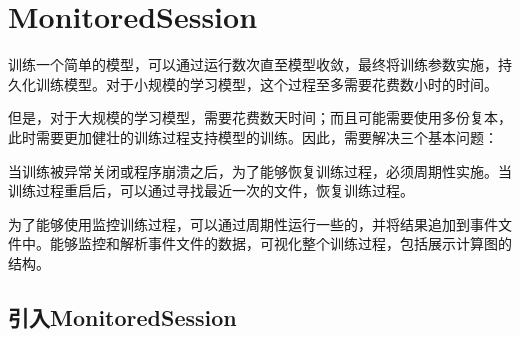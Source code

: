 \begin{savequote}[45mm]
\end{savequote}

\chapter{MonitoredSession} 
\label{ch:monitored-session}

\begin{content}

训练一个简单的模型，可以通过运行数次直至模型收敛，最终将训练参数实施，持久化训练模型。对于小规模的学习模型，这个过程至多需要花费数小时的时间。

但是，对于大规模的学习模型，需要花费数天时间；而且可能需要使用多份复本，此时需要更加健壮的训练过程支持模型的训练。因此，需要解决三个基本问题：

\begin{enum}
\end{enum}

当训练被异常关闭或程序崩溃之后，为了能够恢复训练过程，必须周期性实施。当训练过程重启后，可以通过寻找最近一次的文件，恢复训练过程。

为了能够使用监控训练过程，可以通过周期性运行一些的，并将结果追加到事件文件中。能够监控和解析事件文件的数据，可视化整个训练过程，包括展示计算图的结构。

\end{content}

\section{引入MonitoredSession}

